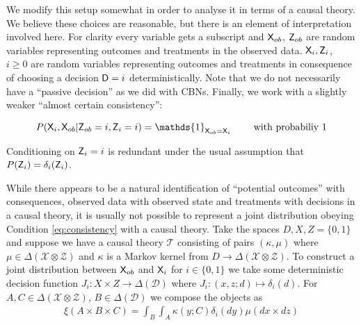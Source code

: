 We modify this setup somewhat in order to analyse it in terms of a causal theory. We believe these choices are reasonable, but there is an element of interpretation involved here. For clarity every variable gets a subscript and $\mathsf{X}_{ob}$, $\mathsf{Z}_{ob}$ are random variables representing outcomes and treatments in the observed data. $\mathsf{X}_i, \mathsf{Z}_i$, $i\geq 0$ are random variables representing outcomes and treatments in consequence of choosing a decision $\mathsf{D}=i$ deterministically. Note that we do not necessarily have a ``passive decision'' as we did with CBNs. Finally, we work with a slightly weaker ``almost certain consistency'':

\begin{align}
    P(\RV{X}_i,\RV{X}_{ob}|\RV{Z}_{ob}=i,\RV{Z}_i=i)=\mathds{1}_{\RV{X}_{ob}=\RV{X}_i} \qquad\text{ with probabiliy 1}\label{eq:consistency}
\end{align}

Conditioning on $\mathsf{Z}_i=i$ is redundant under the usual assumption that $P(\mathsf{Z}_i) = \delta_i(\mathsf{Z}_i)$.

While there appears to be a natural identification of ``potential outcomes'' with consequences, observed data with observed state and treatments with decisions in a causal theory, it is usually not possible to represent a joint distribution obeying Condition \ref{eq:consistency} with a causal theory. Take the spaces $D,X,Z=\{0,1\}$ and suppose we have a causal theory $\mathscr{T}$ consisting of pairs $(\kappa,\mu)$ where $\mu\in\Delta(\mathcal{X}\otimes\mathcal{Z})$ and $\kappa$ is a Markov kernel from $D\to \Delta(\mathcal{X}\otimes\mathcal{Z})$. To construct a joint distribution between $\mathsf{X}_{ob}$ and $\mathsf{X}_i$ for $i\in \{0,1\}$ we take some deterministic decision function $J_i:X\times Z\to \Delta(\mathcal{D})$ where $J_i:(x,z;d)\mapsto \delta_i(d)$. For $A,C\in \Delta(\mathcal{X}\otimes\mathcal{Z})$, $B\in \Delta(\mathcal{D})$ we compose the objects as 
\begin{align}
    \xi(A\times B\times C) =  \int_B \int_A  \kappa(y; C) \delta_i(dy) \mu(dx\times dz)
\end{align}

